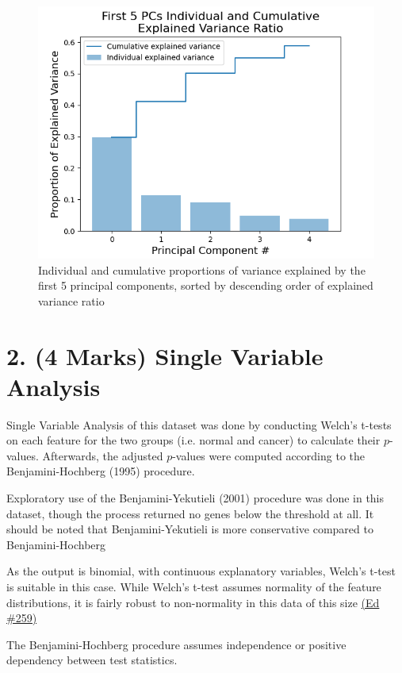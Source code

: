 \documentclass[twocolumn]{article}
\begin{document}
\begin{figure}[H]
    \centering
    \includegraphics[width=\linewidth]{figures/PCA_Top_5_Explained_Variance_Curve.png}
    \caption{Individual and cumulative proportions of variance explained by the first 5 principal components, sorted by descending order of explained variance ratio}
    \label{fig:pc-variance-first-5}
\end{figure}


\section{2. (4 Marks) Single Variable Analysis}
Single Variable Analysis of this dataset was done by conducting Welch's t-tests on each feature for the two groups (i.e. normal and cancer) to calculate their $p$-values. Afterwards, the adjusted $p$-values were computed according to the Benjamini-Hochberg (1995) \cite{BenjaminiHochberg1995} procedure.

Exploratory use of the Benjamini-Yekutieli (2001) procedure was done in this dataset, though the process returned no genes below the threshold at all. It should be noted that Benjamini-Yekutieli is more conservative compared to Benjamini-Hochberg

As the output is binomial, with continuous explanatory variables, Welch's t-test is suitable in this case. While Welch's t-test assumes normality of the feature distributions, it is fairly robust to non-normality in this data of this size \href{https://edstem.org/au/courses/13108/discussion/1697987}{(Ed \#259)}

The Benjamini-Hochberg procedure assumes independence or positive dependency between test statistics.
\end{document}
